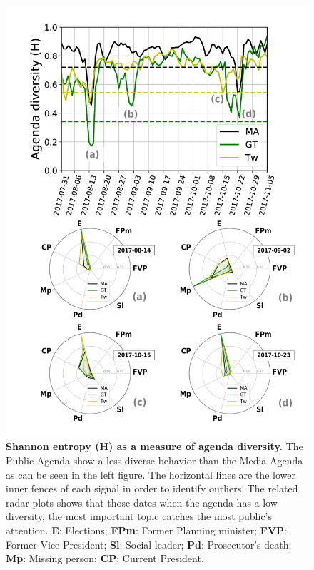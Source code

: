 \documentclass{bmcart}
\begin{document}
\begin{backmatter}
\begin{figure}[h!]
\includegraphics[height=0.7\textheight]{Fig3.pdf}
\caption{\textbf{Shannon entropy (H) as a measure of agenda diversity.} The Public Agenda show a less diverse behavior than the Media Agenda as can be seen in the left figure. The horizontal lines are the lower inner fences of each signal in order to identify outliers. The related radar plots shows that those dates when the agenda has a low diversity, the most important topic catches the most public’s attention. \textbf{E}: Elections; \textbf{FPm}: Former Planning minister; \textbf{FVP}: Former Vice-President; \textbf{Sl}: Social leader; \textbf{Pd}: Prosecutor's death; \textbf{Mp}: Missing person; \textbf{CP}: Current President.}
\label{fig:shannon_entropy_agendas}
\end{figure}


\end{backmatter}
\end{document}
